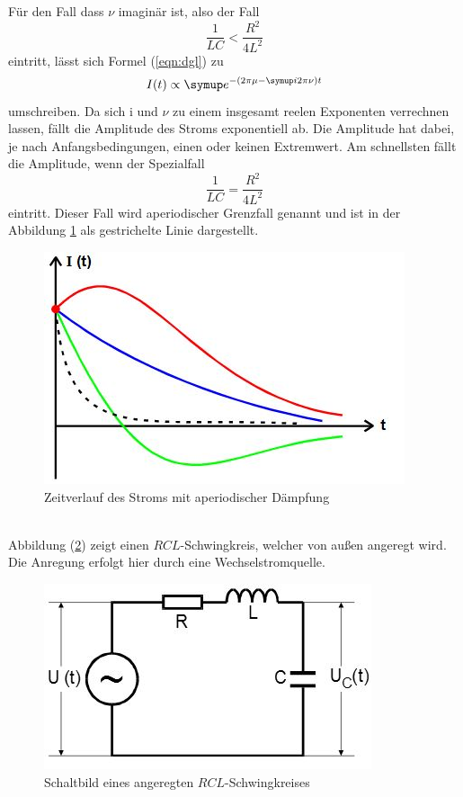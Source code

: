 Für den Fall dass $\nu$ imaginär ist, also der Fall
\begin{equation*}
  \frac{1}{LC} < \frac{R^2}{4L^2}
\end{equation*}
eintritt, lässt sich Formel (\ref{eqn:dgl}) zu
\begin{equation}
  I(t)\propto\su{e}^{-(2\pi\mu -\su{i}2\pi\nu)t}
\end{equation}
umschreiben.
Da sich i und $\nu$ zu einem insgesamt reelen Exponenten verrechnen lassen, fällt
die Amplitude des Stroms exponentiell ab. Die Amplitude hat dabei, je nach
Anfangsbedingungen, einen oder keinen Extremwert. Am schnellsten fällt die
Amplitude, wenn der Spezialfall
\begin{equation*}
  \frac{1}{LC} = \frac{R^2}{4L^2}
\end{equation*}
eintritt. Dieser Fall wird aperiodischer Grenzfall genannt und ist in der
Abbildung \ref{fig:agf} als gestrichelte Linie dargestellt.
\begin{figure}[h]
  \centering
  \includegraphics{Bilder/aperiod.JPG}
  \caption{Zeitverlauf des Stroms mit aperiodischer Dämpfung\cite{354}}
  \label{fig:agf}
\end{figure}
\\
Abbildung (\ref{fig:angeregt}) zeigt einen $RCL$-Schwingkreis, welcher von
außen angeregt wird. Die Anregung erfolgt hier durch eine Wechselstromquelle.
\begin{figure}[h]
  \centering
  \includegraphics{Bilder/angeregt.JPG}
  \caption{Schaltbild eines angeregten $RCL$-Schwingkreises\cite{354}}
  \label{fig:angeregt}
\end{figure}
